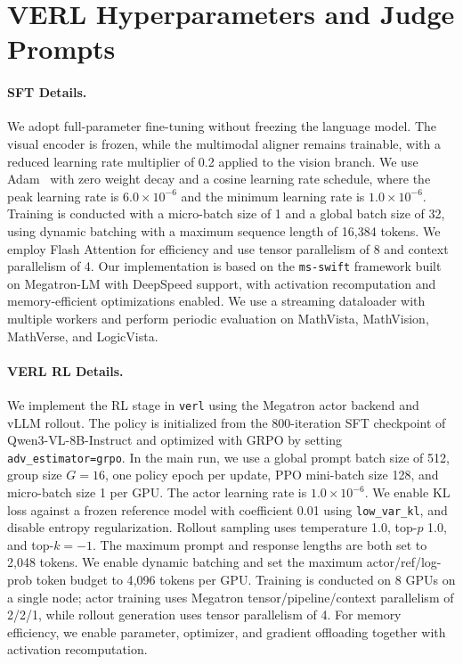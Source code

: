 \appendix
\section{VERL Hyperparameters and Judge Prompts}\label{app:verl_details}

\paragraph{SFT Details.}
We adopt full-parameter fine-tuning without freezing the language model.
The visual encoder is frozen, while the multimodal aligner remains trainable, with a reduced learning rate multiplier of 0.2 applied to the vision branch.
We use Adam~\cite{kingma2015adam} with zero weight decay and a cosine learning rate schedule, where the peak learning rate is $6.0 \times 10^{-6}$ and the minimum learning rate is $1.0 \times 10^{-6}$.
Training is conducted with a micro-batch size of 1 and a global batch size of 32, using dynamic batching with a maximum sequence length of 16{,}384 tokens.
We employ Flash Attention for efficiency and use tensor parallelism of 8 and context parallelism of 4.
Our implementation is based on the \texttt{ms-swift} framework built on Megatron-LM with DeepSpeed support, with activation recomputation and memory-efficient optimizations enabled.
We use a streaming dataloader with multiple workers and perform periodic evaluation on MathVista, MathVision, MathVerse, and LogicVista.

\paragraph{VERL RL Details.}
We implement the RL stage in \texttt{verl} using the Megatron actor backend and vLLM rollout.
The policy is initialized from the 800-iteration SFT checkpoint of Qwen3-VL-8B-Instruct and optimized with GRPO by setting \texttt{adv\_estimator=grpo}.
In the main run, we use a global prompt batch size of 512, group size $G=16$, one policy epoch per update, PPO mini-batch size 128, and micro-batch size 1 per GPU.
The actor learning rate is $1.0 \times 10^{-6}$.
We enable KL loss against a frozen reference model with coefficient 0.01 using \texttt{low\_var\_kl}, and disable entropy regularization.
Rollout sampling uses temperature 1.0, top-$p$ 1.0, and top-$k=-1$.
The maximum prompt and response lengths are both set to 2{,}048 tokens.
We enable dynamic batching and set the maximum actor/ref/log-prob token budget to 4{,}096 tokens per GPU.
Training is conducted on 8 GPUs on a single node; actor training uses Megatron tensor/pipeline/context parallelism of 2/2/1, while rollout generation uses tensor parallelism of 4.
For memory efficiency, we enable parameter, optimizer, and gradient offloading together with activation recomputation.

